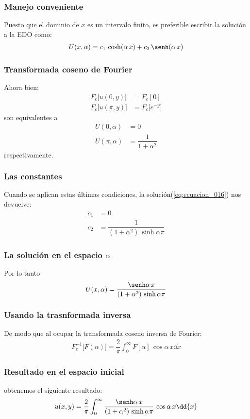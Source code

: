 \begin{frame}
\frametitle{Manejo conveniente}
Puesto que el dominio de $x$ es un intervalo finito, es preferible escribir la solución a la EDO como:
\begin{align}
U(x, \alpha) = c_{1} \, \cosh (\alpha \, x) + c_{2} \, \senh (\alpha \, x)
\label{eq:ecuacion_016}
\end{align}
\end{frame}
\begin{frame}
\frametitle{Transformada coseno de Fourier}
Ahora bien:
\begin{align*}
F_{c} \big[ u(0, y)\big] &= F_{c} [0] \\[0.5em]
F_{c} \big[ u(\pi, y)\big] &= F_{c} \big[ e^{-y} \big]
\end{align*}
son equivalentes a
\begin{align*}
U(0, \alpha) &= 0 \\[0.5em]
U(\pi, \alpha) &= \dfrac{1}{1 +  \alpha^{2}}
\end{align*}
respectivamente.
\end{frame}
\begin{frame}
\frametitle{Las constantes}
Cuando se aplican estas últimas condiciones, la solución(\ref{eq:ecuacion_016}) nos devuelve:
\begin{align*}
c_{1} &= 0 \\[0.5em]
c_{2} &= \dfrac{1}{(1 + \alpha^{2}) \, \sinh \alpha \pi}
\end{align*}
\end{frame}
\begin{frame}
\frametitle{La solución en el espacio $\alpha$}
Por lo tanto
\begin{align*}
U(x, \alpha) = \dfrac{\senh \alpha \, x}{(1 + \alpha^{2}) \, \sinh \alpha \pi}
\end{align*}
\end{frame}
\begin{frame}
\frametitle{Usando la trasnformada inversa}
De modo que al ocupar la transformada coseno inversa de Fourier:
\begin{align*}
F_{c}^{-1} \big[F(\alpha)\big] = \dfrac{2}{\pi} \int_{0}^{\infty} F[\alpha] \, \cos \alpha \, x \dd{x}
\end{align*}
\end{frame}
\begin{frame}
\frametitle{Resultado en el espacio inicial}
obtenemos el siguiente resultado:
\begin{align*}
u(x, y) = \dfrac{2}{\pi} \int_{0}^{\infty}  \dfrac{\senh \alpha \, x}{(1 + \alpha^{2}) \, \sinh \alpha \pi} \, \cos \alpha \, x \dd{x}
\end{align*}
\end{frame}
